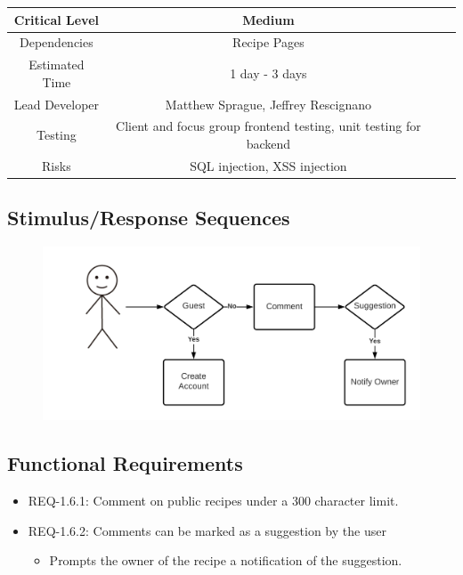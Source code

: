 \documentclass{scrreprt}
\begin{document}
\begin{center}
    \begin{tabular}{| c | c | c | c |}
        \hline
        Critical Level & Medium                                                            \\
        \hline
        Dependencies   & Recipe Pages                                                      \\
        \hline
        Estimated Time & 1 day - 3 days                                                    \\
        \hline
        Lead Developer & Matthew Sprague, Jeffrey Rescignano                               \\
        \hline
        Testing         & Client and focus group \gls{frontend} testing,
                          \gls{unit testing} for \gls{backend}                             \\
        \hline
        Risks          & \gls{SQL injection}, \gls{XSS injection}                          \\
        \hline
    \end{tabular}
\end{center}

\subsection{Stimulus/Response Sequences}

\begin{figure}[H]\centering
    \includegraphics[width=\columnwidth]{FlowCharts/Recipe-Commenting.png}
\end{figure}

\subsection{\gls{Functional Requirements}}

\begin{itemize}
    \item REQ-1.6.1: Comment on public recipes under a 300 character limit.
    \item REQ-1.6.2: Comments can be marked as a suggestion by the user
          \begin{itemize}
              \item Prompts the owner of the recipe a notification of the suggestion.
          \end{itemize}
\end{itemize}
\end{document}
